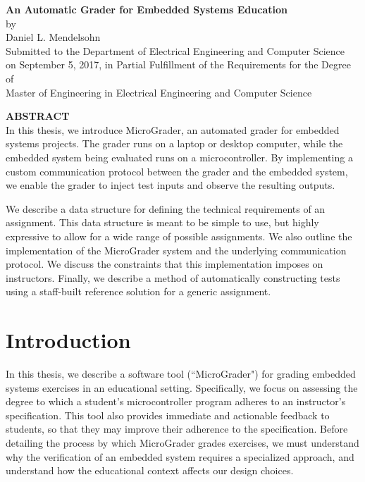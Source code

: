 \documentclass[12pt]{article}
\newcommand{\mytitle}{\textbf{An Automatic Grader for Embedded Systems Education}}
\newcommand{\mydate}{September 5, 2017}
\begin{document}
\addtocounter{page}{1}

\newpage
\mbox{}
\newpage

\begin{center}
\mytitle \\
by \\
Daniel L. Mendelsohn \\
\vspace{12pt}
Submitted to the Department of Electrical Engineering and Computer Science\\
 on \mydate{}, in Partial Fulfillment of the Requirements for the Degree of\\
 Master of Engineering in Electrical Engineering and Computer Science
\end{center}
\vspace{12pt}
\textbf{ABSTRACT} \\

\noindent In this thesis, we introduce MicroGrader, an automated grader for embedded systems projects.  The grader runs on a laptop or desktop computer, while the embedded system being evaluated runs on a microcontroller.  By implementing a custom communication protocol between the grader and the embedded system, we enable the grader to inject test inputs and observe the resulting outputs.

We describe a data structure for defining the technical requirements of an assignment.  This data structure is meant to be simple to use, but highly expressive to allow for a wide range of possible assignments.  We also outline the implementation of the MicroGrader system and the underlying communication protocol.  We discuss the constraints that this implementation imposes on instructors.  Finally, we describe a method of automatically constructing tests using a staff-built reference solution for a generic assignment. 

\newpage
\mbox{}
\newpage

\tableofcontents

\newpage
\listoffigures
\listoftables

\doublespacing

\newpage
\section{Introduction}
In this thesis, we describe a software tool (``MicroGrader") for grading embedded systems exercises in an educational setting.  Specifically, we focus on assessing the degree to which a student's microcontroller program adheres to an instructor's specification.  This tool also provides immediate and actionable feedback to students, so that they may improve their adherence to the specification.  Before detailing the process by which MicroGrader grades exercises, we must understand why the verification of an embedded system requires a specialized approach, and understand how the educational context affects our design choices.
\end{document}

